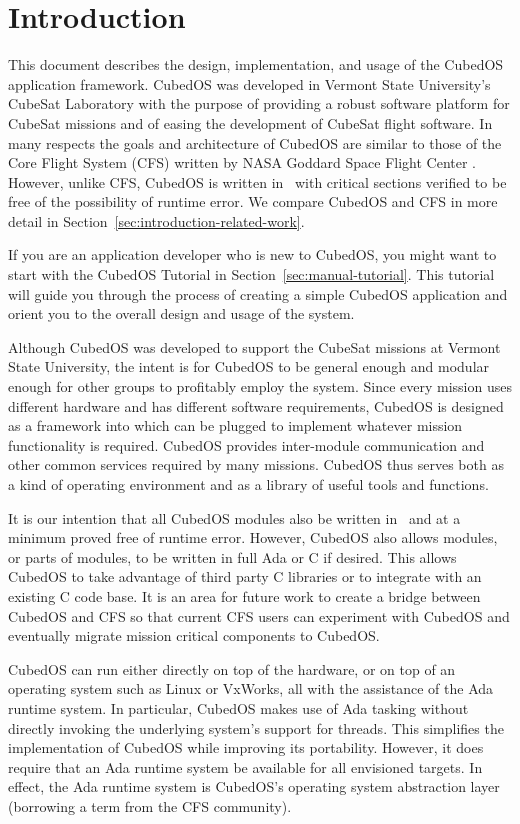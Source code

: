 
\newpage
\chapter{Introduction}
\label{chapt:introduction}

This document describes the design, implementation, and usage of the CubedOS application
framework. CubedOS was developed in Vermont State University's CubeSat Laboratory with the
purpose of providing a robust software platform for CubeSat missions and of easing the
development of CubeSat flight software. In many respects the goals and architecture of CubedOS
are similar to those of the Core Flight System (CFS) written by NASA Goddard Space Flight Center
\cite{cFE}. However, unlike CFS, CubedOS is written in \SPARK\ with critical sections verified
to be free of the possibility of runtime error. We compare CubedOS and CFS in more detail in
Section~\ref{sec:introduction-related-work}.

If you are an application developer who is new to CubedOS, you might want to start with the
CubedOS Tutorial in Section~\ref{sec:manual-tutorial}. This tutorial will guide you through the
process of creating a simple CubedOS application and orient you to the overall design and usage
of the system.

Although CubedOS was developed to support the CubeSat missions at Vermont State University, the
intent is for CubedOS to be general enough and modular enough for other groups to profitably
employ the system. Since every mission uses different hardware and has different software
requirements, CubedOS is designed as a framework into which  can be plugged to
implement whatever mission functionality is required. CubedOS provides inter-module
communication and other common services required by many missions. CubedOS thus serves both as a
kind of operating environment and as a library of useful tools and functions.

It is our intention that all CubedOS modules also be written in \SPARK\ and at a minimum proved
free of runtime error. However, CubedOS also allows modules, or parts of modules, to be written
in full Ada or C if desired. This allows CubedOS to take advantage of third party C libraries or
to integrate with an existing C code base. It is an area for future work to create a bridge
between CubedOS and CFS so that current CFS users can experiment with CubedOS and eventually
migrate mission critical components to CubedOS.

CubedOS can run either directly on top of the hardware, or on top of an operating system such as
Linux or VxWorks, all with the assistance of the Ada runtime system. In particular, CubedOS
makes use of Ada tasking without directly invoking the underlying system's support for threads.
This simplifies the implementation of CubedOS while improving its portability. However, it does
require that an Ada runtime system be available for all envisioned targets. In effect, the Ada
runtime system is CubedOS's operating system abstraction layer (borrowing a term from the CFS
community).

